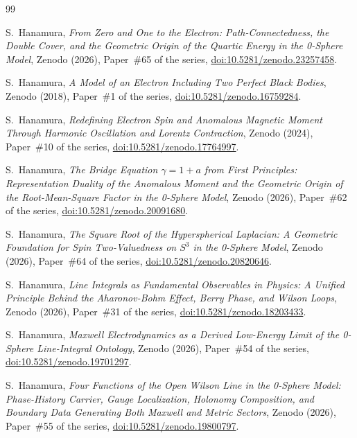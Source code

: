 \documentclass[%
 reprint, amsmath,amssymb, aps, prb, ]{revtex4-2}
\numberwithin{equation}{section}
\begin{document}
\begin{thebibliography}{99}

 S.~Hanamura, \emph{From Zero and One to the Electron: Path-Connectedness, the Double Cover, and the Geometric Origin of the Quartic Energy in the 0-Sphere Model}, Zenodo (2026), Paper~\#65 of the series, \href{https://doi.org/10.5281/zenodo.23257458}{doi:10.5281/zenodo.23257458}.

 S.~Hanamura, \emph{A Model of an Electron Including Two Perfect Black Bodies}, Zenodo (2018), Paper~\#1 of the series, \href{https://doi.org/10.5281/zenodo.16759284}{doi:10.5281/zenodo.16759284}.

 S.~Hanamura, \emph{Redefining Electron Spin and Anomalous Magnetic Moment Through Harmonic Oscillation and Lorentz Contraction}, Zenodo (2024), Paper~\#10 of the series, \href{https://doi.org/10.5281/zenodo.17764997}{doi:10.5281/zenodo.17764997}.

 S.~Hanamura, \emph{The Bridge Equation $\gamma = 1 + a$ from First Principles: Representation Duality of the Anomalous Moment and the Geometric Origin of the Root-Mean-Square Factor in the 0-Sphere Model}, Zenodo (2026), Paper~\#62 of the series, \href{https://doi.org/10.5281/zenodo.20091680}{doi:10.5281/zenodo.20091680}.

 S.~Hanamura, \emph{The Square Root of the Hyperspherical Laplacian: A Geometric Foundation for Spin Two-Valuedness on $S^3$ in the 0-Sphere Model}, Zenodo (2026), Paper~\#64 of the series, \href{https://doi.org/10.5281/zenodo.20820646}{doi:10.5281/zenodo.20820646}.

 S.~Hanamura, \emph{Line Integrals as Fundamental Observables in Physics: A Unified Principle Behind the Aharonov-Bohm Effect, Berry Phase, and Wilson Loops}, Zenodo (2026), Paper~\#31 of the series, \href{https://doi.org/10.5281/zenodo.18203433}{doi:10.5281/zenodo.18203433}.

 S.~Hanamura, \emph{Maxwell Electrodynamics as a Derived Low-Energy Limit of the 0-Sphere Line-Integral Ontology}, Zenodo (2026), Paper~\#54 of the series, \href{https://doi.org/10.5281/zenodo.19701297}{doi:10.5281/zenodo.19701297}.

 S.~Hanamura, \emph{Four Functions of the Open Wilson Line in the 0-Sphere Model: Phase-History Carrier, Gauge Localization, Holonomy Composition, and Boundary Data Generating Both Maxwell and Metric Sectors}, Zenodo (2026), Paper~\#55 of the series, \href{https://doi.org/10.5281/zenodo.19800797}{doi:10.5281/zenodo.19800797}.


\end{thebibliography}
\end{document}
